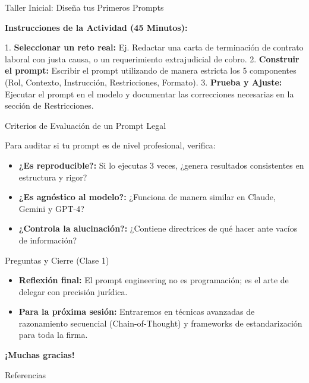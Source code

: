 \documentclass[aspectratio=169]{beamer}
\begin{document}
\begin{frame}[fragile]{Taller Inicial: Diseña tus Primeros Prompts}


\textbf{Instrucciones de la Actividad (45 Minutos):}

1. \textbf{Seleccionar un reto real:} Ej. Redactar una carta de terminación de contrato laboral con justa causa, o un requerimiento extrajudicial de cobro.
2. \textbf{Construir el prompt:} Escribir el prompt utilizando de manera estricta los 5 componentes (Rol, Contexto, Instrucción, Restricciones, Formato).
3. \textbf{Prueba y Ajuste:} Ejecutar el prompt en el modelo y documentar las correcciones necesarias en la sección de Restricciones.


\end{frame}



\begin{frame}[fragile]{Criterios de Evaluación de un Prompt Legal}


Para auditar si tu prompt es de nivel profesional, verifica:

\begin{itemize}
  \item \textbf{¿Es reproducible?:} Si lo ejecutas 3 veces, ¿genera resultados consistentes en estructura y rigor?
  \item \textbf{¿Es agnóstico al modelo?:} ¿Funciona de manera similar en Claude, Gemini y GPT-4?
  \item \textbf{¿Controla la alucinación?:} ¿Contiene directrices de qué hacer ante vacíos de información?
\end{itemize}
\end{frame}



\begin{frame}[fragile]{Preguntas y Cierre (Clase 1)}


\begin{itemize}
  \item \textbf{Reflexión final:} El prompt engineering no es programación; es el arte de delegar con precisión jurídica.
  \item \textbf{Para la próxima sesión:} Entraremos en técnicas avanzadas de razonamiento secuencial (Chain-of-Thought) y frameworks de estandarización para toda la firma.
\end{itemize}
\textbf{¡Muchas gracias!}

\end{frame}




\begin{frame}[allowframebreaks]{Referencias}
  
  
\end{frame}
\end{document}
